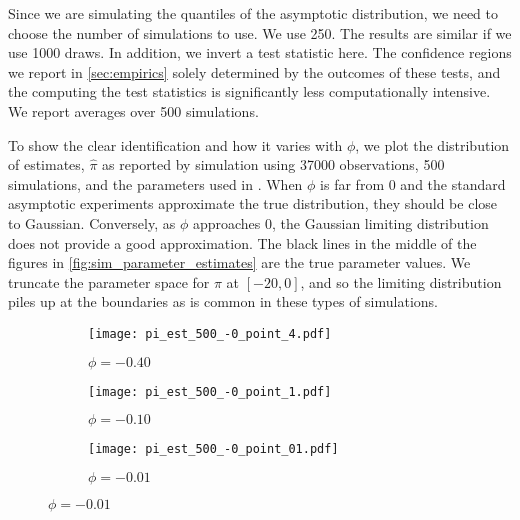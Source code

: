 \documentclass[11pt, letterpaper, twoside]{article}
\begin{document}


Since we are simulating the quantiles of the asymptotic distribution, we need to choose the number of simulations to use. We use \num{250}. The results are similar if we use \num{1000} draws. In addition, we invert a test statistic here. The confidence regions we report in \cref{sec:empirics} solely determined by the outcomes of these tests, and the computing the test statistics is significantly less computationally intensive.
We report averages over \num{500} simulations.

To show the clear identification and how it varies with $\phi$, we plot the distribution of estimates, $\widehat{\pi}$ as reported by simulation using \num{37000} observations, \num{500} simulations, and the parameters used in \textcite{han2018leverage}. When $\phi$ is far from $0$ and the standard asymptotic experiments approximate the true distribution, they should be close to Gaussian. Conversely, as $\phi$ approaches $0$, the Gaussian limiting distribution does not provide a good approximation. The black lines in the middle of the figures in \cref{fig:sim_parameter_estimates} are the true parameter values.  We truncate the parameter space for $\pi$ at $[-20, 0]$, and so the limiting distribution piles up at the boundaries as is common in these types of simulations.   

\begin{figure}[htb]
    
    \caption[t-statistics]{Parameter Estimates}
    \label{fig:sim_parameter_estimates}


    \begin{subfigure}[t]{.32\textwidth}
        \caption[phi = -0.40]{$\phi = -0.40$}
        \texttt{[image: pi\_est\_500\_-0\_point\_4.pdf]}
    \end{subfigure}
    \begin{subfigure}[t]{.32\textwidth}
        \caption[phi = -0.10]{$\phi = -0.10$}
        \texttt{[image: pi\_est\_500\_-0\_point\_1.pdf]}
    \end{subfigure}
    \begin{subfigure}[t]{.32\textwidth}
        \caption[phi = -0.01]{$\phi = -0.01$}
        \texttt{[image: pi\_est\_500\_-0\_point\_01.pdf]}
    \end{subfigure}

\end{figure}
\end{document}
